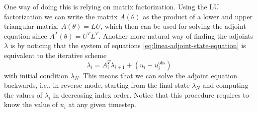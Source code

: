 One way of doing this is relying on matrix factorization. 
Using the LU factorization we can write the matrix $A(\theta)$ as the product of a lower and upper triangular matrix, $A (\theta) = LU$, which then can be used for solving the adjoint equation since $A^T(\theta)=U^TL^T$.
Another more natural way of finding the adjoints $\lambda$ is by noticing that the system of equations \eqref{eq:linea-adjoint-state-equation} is equivalent to the iterative scheme
\begin{equation}
    \lambda_{i} = A_{i}^T \lambda_{i+1} + (u_i - u_i^\text{obs})
\end{equation}
with initial condition $\lambda_N$. 
This means that we can solve the adjoint equation backwards, i.e., in reverse mode, starting from the final state $\lambda_N$ and computing the values of $\lambda_i$ in decreasing index order. 
Notice that this procedure requires to know the value of $u_i$ at any given timestep. 





